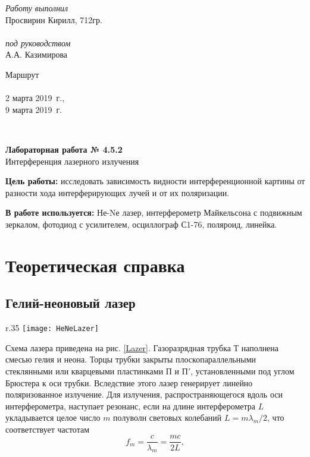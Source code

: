 \documentclass{MagicLabs}
\begin{document}
	
	
\begin{minipage}[l]{0.3\textwidth}
	\textit{Работу выполнил}\\
	Просвирин Кирилл, 712гр.\\\\
	\textit{под руководством}\\
	А.А. Казимирова
\end{minipage}
\hfill
\begin{minipage}[l]{0.21\textwidth}
	Маршрут  \\\\
	2 марта 2019~г.,\\
	9 марта 2019~г.\\
\end{minipage}
\\[20pt]
\begin{center}
	\LARGE{\textbf{Лабораторная работа № 4.5.2}\\
		Интерференция лазерного излучения\\[20pt]}
\end{center}



\textbf{Цель работы: }исследовать зависимость видности интерференционной картины от разности хода интерферирующих лучей и от их поляризации.

\textbf{В работе используется: }Не-Nе лазер, интерферометр Майкельсона с подвижным зеркалом, фотодиод с усилителем, осциллограф С1-76, поляроид, линейка.


\section{Теоретическая справка}

\subsection*{Гелий-неоновый лазер}

\begin{wrapfigure}[7]{r}{.35\textwidth}\centering
	\vspace{-3ex}
	\texttt{[image: HeNeLazer]}
	\caption{Схема лазера}
	\label{Lazer}
\end{wrapfigure}

Схема лазера приведена на рис. \ref{Lazer}. Газоразрядная трубка Т наполнена
смесью гелия и неона. Торцы трубки  закрыты плоскопараллельными стеклянными или
кварцевыми пластинками $ П $ и $ П' $, установленными под углом Брюстера к оси трубки.
Вследствие этого лазер генерирует 
линейно поляризованное излучение. Для излучения, распространяющегося вдоль оси
интерферометра, наступает резонанс, если на длине интерферометра $ L $ 
укладывается целое число $ m $ полуволн световых колебаний $ L = m\lambda_m/2 $, 
что соответствует частотам
\begin{equation}\label{frequency}
	f_m=\dfrac{c}{\lambda_m}=\dfrac{mc}{2L},
\end{equation}
 
\end{document}
